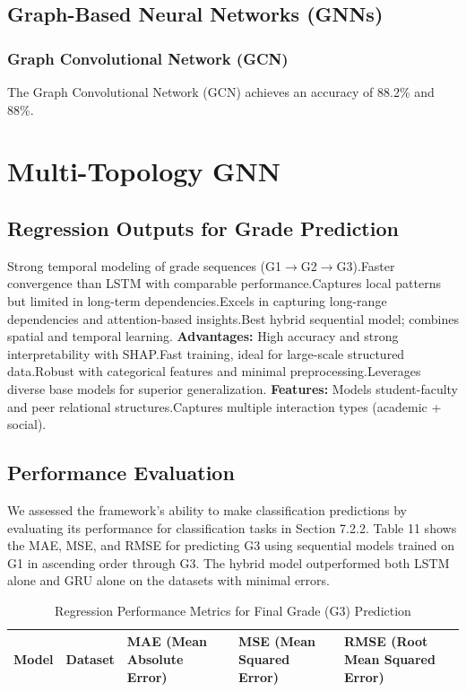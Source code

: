 \documentclass[twocolumn]{svjour3}
\begin{document}
\subsection{Graph-Based Neural Networks (GNNs)}
\subsubsection{Graph Convolutional Network (GCN)}
The Graph Convolutional Network (GCN) achieves an accuracy of 88.2\% and 88\%.

\section{Multi-Topology GNN}
\subsection{Regression Outputs for Grade Prediction}
Strong temporal modeling of grade sequences (G1$\rightarrow$G2$\rightarrow$G3).Faster convergence than LSTM with comparable performance.Captures local patterns but limited in long-term dependencies.Excels in capturing long-range dependencies and attention-based insights.Best hybrid sequential model; combines spatial and temporal learning.
\textbf{Advantages:}
High accuracy and strong interpretability with SHAP.Fast training, ideal for large-scale structured data.Robust with categorical features and minimal preprocessing.Leverages diverse base models for superior generalization.
\textbf{Features:}
Models student-faculty and peer relational structures.Captures multiple interaction types (academic + social).
\subsection{Performance Evaluation}
We assessed the framework’s ability to make classification predictions by evaluating its performance for classification tasks in Section 7.2.2. Table 11 shows the MAE, MSE, and RMSE for predicting G3 using sequential models trained on G1 in ascending order through G3. The hybrid model outperformed both LSTM alone and GRU alone on the datasets with minimal errors.
\begin{table}
\centering
\caption{Regression Performance Metrics for Final Grade (G3) Prediction}
\begin{tabular}{lll}
\hline
Model & Dataset & MAE (Mean Absolute Error) & MSE (Mean Squared Error) & RMSE (Root Mean Squared Error) \\
\hline
\end{tabular}
\end{table}
\end{document}
